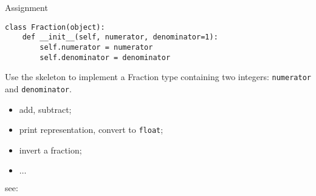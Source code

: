 \documentclass{beamer}
\begin{document}
\begin{frame}[fragile]{Assignment}
\begin{verbatim}
class Fraction(object):
    def __init__(self, numerator, denominator=1):
        self.numerator = numerator
        self.denominator = denominator
\end{verbatim}

\bigskip

Use the skeleton to implement a \textcolor{pms280_compl}{Fraction} type
containing two integers: \texttt{numerator} and
\texttt{denominator}.

\begin{itemize}
\item add, subtract;
\item print representation, convert to \texttt{float};
\item invert a fraction;
\item $\ldots$
\end{itemize}

\bigskip

see: 
\end{frame}
\end{document}
